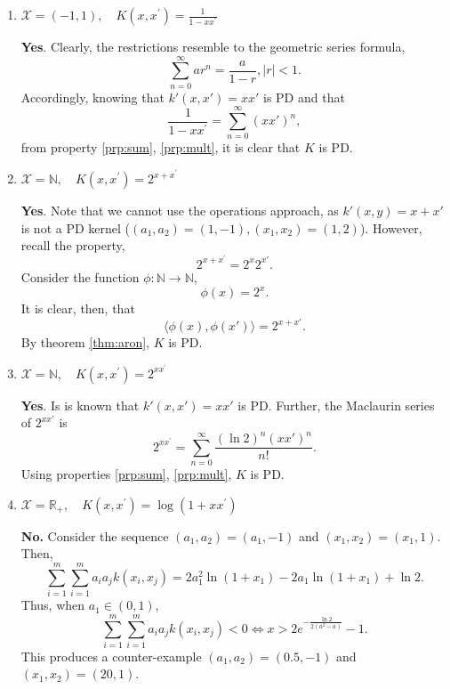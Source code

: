 \documentclass{article}[12pt]
\begin{document}
\begin{enumerate}
\item $\mathcal{X}=(-1,1), \quad K\left(x, x^{\prime}\right)=\frac{1}{1-x x^{\prime}}$

\textbf{Yes}. Clearly, the restrictions resemble to the geometric series formula,
\begin{equation}
\sum_{n=0}^{\infty}a r^n = \frac{a}{1-r}, |r| < 1.
\end{equation}
Accordingly, knowing that $k'(x, x') = xx'$ is PD and that
\begin{equation}
\frac{1}{1-x x^{\prime}} = \sum_{n=0}^{\infty} (xx')^n,
\end{equation}
from property \ref{prp:sum}, \ref{prp:mult}, it is clear that $K$ is PD.

\item $\mathcal{X}=\mathbb{N}, \quad K\left(x, x^{\prime}\right)=2^{x+x^{\prime}}$

\textbf{Yes}. Note that we cannot use the operations approach, as $k'(x, y) = x + x'$ is not a PD kernel ($(a_1, a_2) = (1, -1), (x_1, x_2) = (1, 2)$). However, recall the property,
\begin{equation}
2^{x+x^{\prime}} = 2^x2^{x'}.
\end{equation}
Consider the function $\phi: \mathbb N \rightarrow \mathbb N$, 
\begin{equation}
\phi(x) = 2^x.
\end{equation}
It is clear, then, that
\begin{equation}
\langle \phi(x), \phi(x') \rangle = 2^{x + x'}.
\end{equation}
By theorem \ref{thm:aron}, $K$ is PD.


\item $\mathcal{X}=\mathbb{N}, \quad K\left(x, x^{\prime}\right)=2^{x x^{\prime}}$

\textbf{Yes}. Is is known that $k'(x,x') = xx'$ is PD. Further, the Maclaurin series of $2^{xx'}$ is
\begin{equation}
2^{x x^{\prime}} = \sum_{n=0}^{\infty} \frac{(\ln 2)^n (xx')^n}{n!}.
\end{equation} 
Using properties \ref{prp:sum}, \ref{prp:mult}, $K$ is PD.

\item $\mathcal{X}=\mathbb{R}_{+}, \quad K\left(x, x^{\prime}\right)=\log \left(1+x x^{\prime}\right)$

\textbf{No.} Consider the sequence $(a_1, a_2) = (a_1, -1)$ and $(x_1, x_2) = (x_1, 1)$. Then, 
\begin{equation}
\sum_{i=1}^{m} \sum_{i=1}^{m} a_{i} a_{j} k\left(x_{i}, x_{j}\right) = 2a_1^2 \ln\left(1+ x_1\right)-2a_1 \ln\left(1+ x_1\right) + \ln 2.
\end{equation}
Thus, when $a_1 \in (0, 1)$,
\begin{equation}
\sum_{i=1}^{m} \sum_{i=1}^{m} a_{i} a_{j} k\left(x_{i}, x_{j}\right) < 0 \iff x > 2 e^{-\frac{\ln 2}{2(a^2 - a)}}-1.
\end{equation}
This produces a counter-example $(a_1, a_2) = (0.5, -1)$ and $(x_1, x_2) = (20, 1)$.


\end{enumerate}
\end{document}
